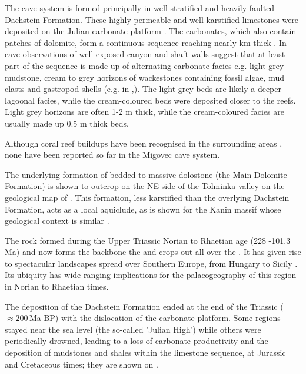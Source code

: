 The  cave system is formed principally in well stratified and heavily faulted Dachstein Formation. These highly permeable and well karstified limestones were deposited on the Julian carbonate platform \citep{ogorelec1996dachstein}.
The carbonates, which also contain patches of dolomite, form a continuous sequence reaching nearly km thick \citep{buser1986tolmavc}.
In cave observations of well exposed canyon and shaft walls suggest that at least part of the sequence is made up of alternating carbonate facies e.g. light grey mudstone, cream to grey horizons of wackestones containing fossil algae, mud clasts and gastropod shells (e.g. in ,). 
The light grey beds are likely a deeper lagoonal facies, while the cream-coloured beds were deposited closer to the reefs. 
Light grey horizons are often 1-2 m thick, while the cream-coloured facies are usually  made up 0.5 m thick beds. 

Although coral reef buildups have been recognised in the surrounding areas \citep{buser1986tolmavc,ogorelec1996dachstein}, none have been reported so far in the Migovec cave system. 

The underlying formation of bedded to massive dolostone (the Main Dolomite Formation) is shown to outcrop on the NE side of the Tolminka valley on the geological map of  \citep{buser1986tolmavc}.
 This formation, less karstified than the overlying Dachstein Formation, acts as a local aquiclude, as is shown for the Kanin massif whose geological context is similar \citep{turk2015hydrogeological}. 

The rock formed during the Upper Triassic Norian to Rhaetian age (228 -101.3\,Ma) and now forms the backbone the  \citep{bosellini1974triassic} and crops out all over the  \citep{fischer1975tidal,schwarzacher2005stratification}. It has given rise to spectacular landscapes spread over Southern Europe, from Hungary \citep{haas2004characteristics} to Sicily \citep{catalano1974ciclotemi}.
Its ubiquity has wide ranging implications for the palaeogeography of this region in Norian to Rhaetian times.

The deposition of the Dachstein Formation ended at the end of the Triassic ($\approx200$\,Ma BP) with the dislocation of the carbonate platform. Some regions stayed near the sea level (the so-called 'Julian High') while others were periodically drowned, leading to a loss of carbonate productivity and the deposition of mudstones and shales within the limestone sequence, at  Jurassic and Cretaceous \citep{vsmuc2010jurassic} times; they are shown on .

